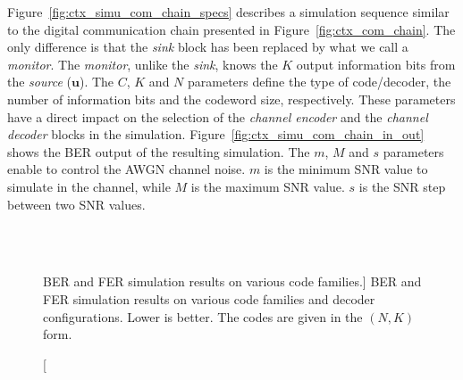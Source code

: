 Figure~\ref{fig:ctx_simu_com_chain_specs} describes a simulation sequence
similar to the digital communication chain presented in
Figure~\ref{fig:ctx_com_chain}. The only difference is that the \emph{sink}
block has been replaced by what we call a \emph{monitor}. The \emph{monitor},
unlike the \emph{sink}, knows the $K$ output information bits from the
\emph{source} ($\bm{u}$). The $C$, $K$ and $N$ parameters define the type of
code/decoder, the number of information bits and the codeword size,
respectively. These parameters have a direct impact on the selection of the
\emph{channel encoder} and the \emph{channel decoder} blocks in the simulation.
Figure~\ref{fig:ctx_simu_com_chain_in_out} shows the BER output of the resulting
simulation. The $m$, $M$ and $s$ parameters enable to control the AWGN channel
noise. $m$ is the minimum SNR value to simulate in the channel, while $M$ is the
maximum SNR value. $s$ is the SNR step between two SNR values.

\begin{figure}[htp]
  \centering
     \quad{}
    \\
    \quad{}
      \\
   \quad{}
  \caption
    [BER and FER simulation results on various code families.]
    {BER and FER simulation results on various code families and decoder
    configurations. Lower is better. The codes are given in the $(N,K)$ form.}
  \label{fig:ctx_bfer}
\end{figure}

